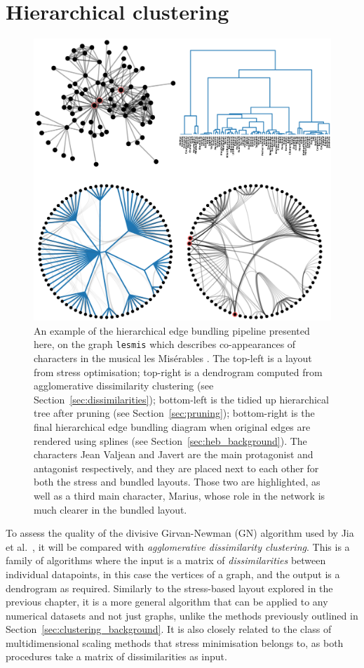 \section{Hierarchical clustering}
\label{sec:hierarchical_clustering}
\begin{figure}
  \centering
  \includegraphics[width=\textwidth]{power/lesmis.pdf}
  \caption[A hierarchical edge bundling pipeline]{An example of the hierarchical edge bundling pipeline presented here, on the graph \texttt{lesmis} which describes co-appearances of characters in the musical les Mis\'erables \cite{Knuth1993}. The top-left is a layout from stress optimisation; top-right is a dendrogram computed from agglomerative dissimilarity clustering (see Section~\ref{sec:dissimilarities}); bottom-left is the tidied up hierarchical tree after pruning (see Section~\ref{sec:pruning}); bottom-right is the final hierarchical edge bundling diagram when original edges are rendered using splines (see Section~\ref{sec:heb_background}).
  The characters Jean Valjean and Javert are the main protagonist and antagonist respectively, and they are placed next to each other for both the stress and bundled layouts. Those two are highlighted, as well as a third main character, Marius, whose role in the network is much clearer in the bundled layout.}
  \label{fig:lesmis}
\end{figure}
To assess the quality of the divisive Girvan-Newman (GN) algorithm used by Jia et al.\ \cite{Jia2011}, it will be compared with \emph{agglomerative dissimilarity clustering}.
This is a family of algorithms where the input is a matrix of \emph{dissimilarities} between individual datapoints, in this case the vertices of a graph, and the output is a dendrogram as required. Similarly to the stress-based layout explored in the previous chapter, it is a more general algorithm that can be applied to any numerical datasets and not just graphs, unlike the methods previously outlined in Section~\ref{sec:clustering_background}. It is also closely related to the class of multidimensional scaling methods that stress minimisation belongs to, as both procedures take a matrix of dissimilarities as input.

